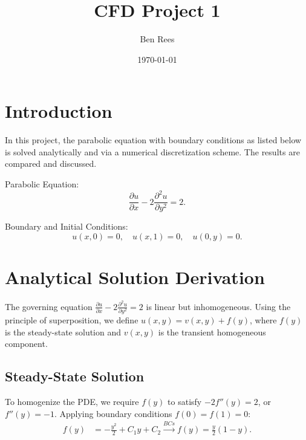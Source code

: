 \documentclass[11pt]{article}
\title{CFD Project 1}
\author{Ben Rees}
\date{\today}
\begin{document}
\maketitle

\section{Introduction}
In this project, the parabolic equation with boundary conditions as listed below is solved analytically and via a 
numerical discretization scheme. The results are compared and discussed.

Parabolic Equation:
$$
\frac{\partial u}{\partial x}-2\frac{\partial^2 u}{\partial y^2}=2.
$$

Boundary and Initial Conditions:
$$
u(x,0)=0,\quad u(x,1)=0,\quad u(0,y)=0.
$$

\section{Analytical Solution Derivation}
The governing equation $\frac{\partial u}{\partial x}-2\frac{\partial^2 u}{\partial y^2}=2$ is linear but inhomogeneous. Using the 
principle of superposition, we define $u(x,y) = v(x,y) + f(y)$, where $f(y)$ is the steady-state solution and $v(x,y)$ is the 
transient homogeneous component.

\subsection{Steady-State Solution}
To homogenize the PDE, we require $f(y)$ to satisfy $-2f''(y) = 2$, or $f''(y) = -1$. Applying boundary conditions $f(0)=f(1)=0$:
\begin{align*}
    f(y) &= -\frac{y^2}{2} + C_1 y + C_2 \xrightarrow{BCs} f(y) = \frac{y}{2}(1-y).
\end{align*}
\end{document}
